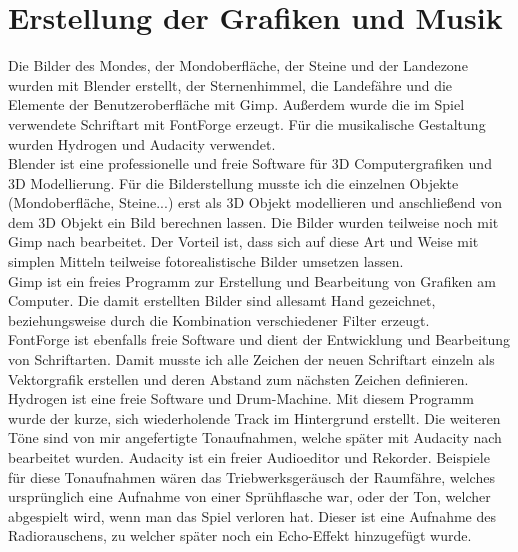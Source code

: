 \documentclass[hidelinks]{article}
\begin{document}
\section{Erstellung der Grafiken und Musik}
Die Bilder des Mondes, der Mondoberfläche, der Steine und der Landezone wurden mit Blender erstellt, der Sternenhimmel, die Landefähre und die Elemente der Benutzeroberfläche mit Gimp. Außerdem wurde die im Spiel verwendete Schriftart mit FontForge erzeugt. Für die musikalische Gestaltung wurden Hydrogen und Audacity verwendet.\\
Blender ist eine professionelle und freie Software für 3D Computergrafiken und 3D Modellierung. Für die Bilderstellung musste ich die einzelnen Objekte (Mondoberfläche, Steine...) erst als 3D Objekt modellieren und anschließend von dem 3D Objekt ein Bild berechnen lassen. Die Bilder wurden teilweise noch mit Gimp nach bearbeitet. Der Vorteil ist, dass sich auf diese Art und Weise mit simplen Mitteln teilweise fotorealistische Bilder umsetzen lassen.\\
Gimp ist ein freies Programm zur Erstellung und Bearbeitung von Grafiken am Computer. Die damit erstellten Bilder sind allesamt Hand gezeichnet, beziehungsweise durch die Kombination verschiedener Filter erzeugt.\\
FontForge ist ebenfalls freie Software und dient der Entwicklung und Bearbeitung von Schriftarten. Damit musste ich alle Zeichen der neuen Schriftart einzeln als Vektorgrafik erstellen und deren Abstand zum nächsten Zeichen definieren.
Hydrogen ist eine freie Software und Drum-Machine. Mit diesem Programm wurde der kurze, sich wiederholende Track im Hintergrund erstellt. Die weiteren Töne sind von mir angefertigte Tonaufnahmen, welche später mit Audacity nach bearbeitet wurden. Audacity ist ein freier Audioeditor und Rekorder. Beispiele für diese Tonaufnahmen wären das Triebwerksgeräusch der Raumfähre, welches ursprünglich eine Aufnahme von einer Sprühflasche war, oder der Ton, welcher abgespielt wird, wenn man das Spiel verloren hat. Dieser ist eine Aufnahme des Radiorauschens, zu welcher später noch ein Echo-Effekt hinzugefügt wurde.
\end{document}
